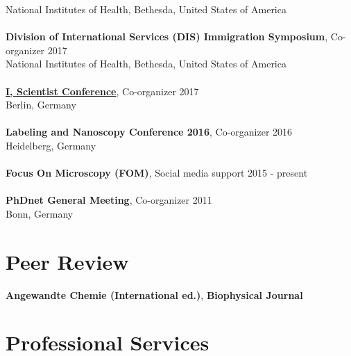 \documentclass[margin,line]{res}
\begin{document}
\begin{resume}
National Institutes of Health, Bethesda, United States of America\\
\vspace*{-3mm}\\
{\bf Division of International Services (DIS) Immigration Symposium}, Co-organizer  \hfill {2017}\\
National Institutes of Health, Bethesda, United States of America\\
\vspace*{-3mm}\\
{\bf \href{https://www.iscientist.berlin/}{I, Scientist Conference}},  Co-organizer \hfill {2017}\\
Berlin, Germany\\
\vspace*{-3mm}\\
{\bf Labeling and Nanoscopy Conference 2016}, Co-organizer \hfill {2016}\\
Heidelberg, Germany\\
\vspace*{-3mm}\\
{\bf Focus On Microscopy (FOM)}, Social media support \hfill {2015 - present}\\
\vspace*{-3mm}\\
{\bf PhDnet General Meeting}, Co-organizer \hfill {2011}\\
Bonn, Germany


\section{\sc Peer Review} 
{\bf Angewandte Chemie (International ed.)}, {\bf Biophysical Journal}


\section{\sc Professional Services}



\end{resume}
\end{document}
